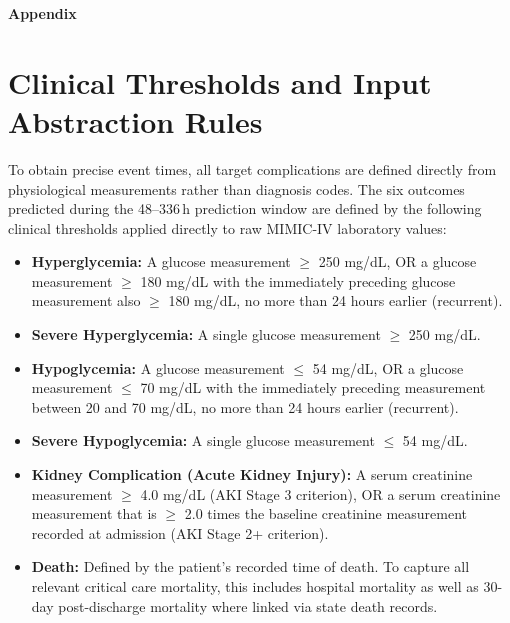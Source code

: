 \appendix
\setcounter{secnumdepth}{2}

\setcounter{topnumber}{3}
\setcounter{bottomnumber}{2}
\setcounter{totalnumber}{5}
\setcounter{dbltopnumber}{3}
\renewcommand{\topfraction}{0.9}
\renewcommand{\bottomfraction}{0.8}
\renewcommand{\textfraction}{0.1}
\renewcommand{\floatpagefraction}{0.8}
\renewcommand{\dbltopfraction}{0.9}
\renewcommand{\dblfloatpagefraction}{0.8}
\makeatletter
\setlength{\@fptop}{0pt}
\setlength{\@fpsep}{12pt}
\setlength{\@fpbot}{0pt plus 1fil}
\setlength{\@dblfptop}{0pt}
\setlength{\@dblfpsep}{12pt}
\setlength{\@dblfpbot}{0pt plus 1fil}
\makeatother



\begin{center}
  \Large\textbf{Appendix}
\end{center}

\section{Clinical Thresholds and Input Abstraction Rules}
\label{app:clinical-thresholds}

To obtain precise event times, all target complications are defined directly from physiological measurements rather than diagnosis codes. The six outcomes predicted during the 48--336\,h prediction window are defined by the following clinical thresholds applied directly to raw MIMIC-IV laboratory values:

\begin{itemize}
    \item \textbf{Hyperglycemia:} A glucose measurement $\ge$ 250 mg/dL, OR a glucose measurement $\ge$ 180 mg/dL with the immediately preceding glucose measurement also $\ge$ 180 mg/dL, no more than 24 hours earlier (recurrent).
    \item \textbf{Severe Hyperglycemia:} A single glucose measurement $\ge$ 250 mg/dL.
    \item \textbf{Hypoglycemia:} A glucose measurement $\le$ 54 mg/dL, OR a glucose measurement $\le$ 70 mg/dL with the immediately preceding measurement between 20 and 70 mg/dL, no more than 24 hours earlier (recurrent).
    \item \textbf{Severe Hypoglycemia:} A single glucose measurement $\le$ 54 mg/dL.
    \item \textbf{Kidney Complication (Acute Kidney Injury):} A serum creatinine measurement $\ge$ 4.0 mg/dL (AKI Stage 3 criterion), OR a serum creatinine measurement that is $\ge$ 2.0 times the baseline creatinine measurement recorded at admission (AKI Stage 2+ criterion).
    \item \textbf{Death:} Defined by the patient's recorded time of death. To capture all relevant critical care mortality, this includes hospital mortality as well as 30-day post-discharge mortality where linked via state death records.
\end{itemize}

